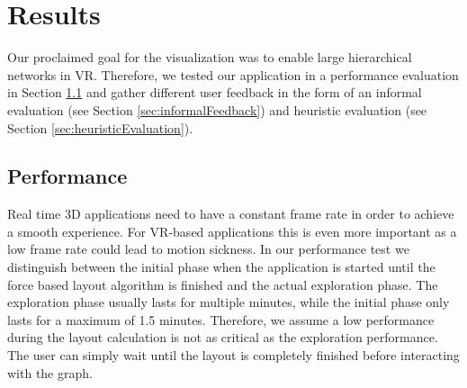 \chapter{Results}

Our proclaimed goal for the visualization was to enable large hierarchical networks in VR. 
Therefore, we tested our application in a performance evaluation in Section \ref{sec:performanceEvaluation} and gather different user feedback in the form of an informal evaluation (see Section \ref{sec:informalFeedback}) and heuristic evaluation (see Section \ref{sec:heuristicEvaluation}).

\section{Performance}
\label{sec:performanceEvaluation}

Real time 3D applications need to have a constant frame rate in order to achieve a smooth experience.
For VR-based applications this is even more important as a low frame rate could lead to motion sickness. 
In our performance test we distinguish between the initial phase when the application is started until the force based layout algorithm is finished and the actual exploration phase. 
The exploration phase usually lasts for multiple minutes, while the initial phase only lasts for a maximum of 1.5 minutes.
Therefore, we assume a low performance during the layout calculation is not as critical as the exploration performance. 
The user can simply wait until the layout is completely finished before interacting with the graph.

